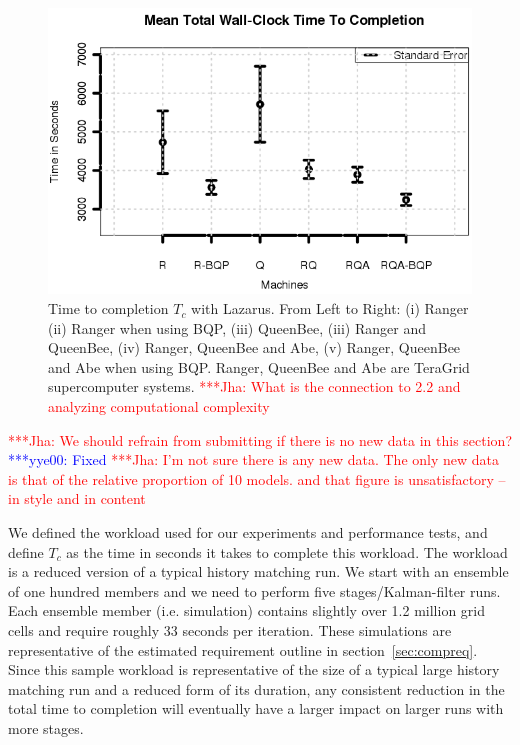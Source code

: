 \documentclass{acm_proc_article-sp}
\newcommand{\tc}{$T_c$ }
\newcommand{\jhanote}[1]{ {\textcolor{red} { ***Jha: #1 }}}
\newcommand{\yyenote}[1]{ {\textcolor{blue} { ***yye00: #1 }}}
\newcommand{\jhanote}[1]{}
\newcommand{\yyenote}[1]{}
\begin{document}
\begin{figure}
\begin{center}
  \includegraphics*[scale=0.5,angle=0]{figures/Figure7.png}
\end{center}
\caption{Time to completion \tc with Lazarus. From Left to Right: (i)
  Ranger (ii) Ranger when using BQP, (iii) QueenBee, (iii) Ranger and
  QueenBee, (iv) Ranger, QueenBee and Abe, (v) Ranger, QueenBee and
  Abe when using BQP. Ranger, QueenBee and Abe are TeraGrid supercomputer
  systems. %
  \jhanote{What is the connection to 2.2 and analyzing computational
    complexity}}
\label{fig:SingleVsDistributed}
\end{figure}

\jhanote{We should refrain from submitting if there is no new data in
  this section?}\yyenote{Fixed}\jhanote{I'm not sure there is any new
  data. The only new data is that of the relative proportion of 10
  models.  and that figure is unsatisfactory -- in style and in
  content} %


We defined the workload used for our experiments and performance
tests, and define \tc as the time in seconds it takes to complete this
workload. The workload is a reduced version of a typical history
matching run. We start with an ensemble of one hundred members and we
need to perform five stages/Kalman-filter runs. Each ensemble member
(i.e. simulation) contains slightly over 1.2 million grid cells
and require roughly 33 seconds per iteration. These simulations are representative
of the estimated requirement outline in section~\ref{sec:compreq}.
Since this sample workload is representative
of the size of a typical large history matching run and a reduced form
of its duration, any consistent reduction in the total time to
completion will eventually have a larger impact on larger runs with
more stages.
\end{document}
